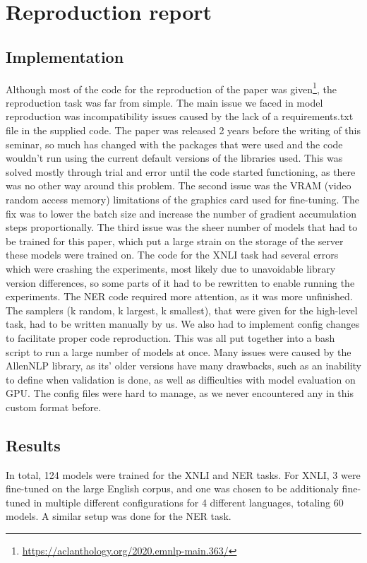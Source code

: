 \documentclass[times, utf8, seminar, english]{fer}
\begin{document}
\chapter[Reproduction report]{Reproduction report}
\section{Implementation}
Although most of the code for the reproduction of the paper was given\footnote{\url{https://aclanthology.org/2020.emnlp-main.363/}}, the reproduction task was far from simple. The main issue we faced in model reproduction was incompatibility issues caused by the lack of a requirements.txt file in the supplied code.  The paper was released 2 years before the writing of this seminar, so much has changed with the packages that were used and the code wouldn't run using the current default versions of the libraries used. This was solved mostly through trial and error until the code started functioning, as there was no other way around this problem. The second issue was the VRAM (video random access memory) limitations of the graphics card used for fine-tuning. The fix was to lower the batch size and increase the number of gradient accumulation steps proportionally. The third issue was the sheer number of models that had to be trained for this paper, which put a large strain on the storage of the server these models were trained on. The code for the XNLI task had several errors which were crashing the experiments, most likely due to unavoidable library version differences, so some parts of it had to be rewritten to enable running the experiments. The NER code required more attention, as it was more unfinished. The samplers (k random, k largest, k smallest), that were given for the high-level task, had to be written manually by us. We also had to implement config changes to facilitate proper code reproduction. This was all put together into a bash script to run a large number of models at once. Many issues were caused by the AllenNLP library, as its' older versions have many drawbacks, such as an inability to define when validation is done, as well as difficulties with model evaluation on GPU. The config files were hard to manage, as we never encountered any in this custom format before.

\section{Results}
\label{section:results}

In total, 124 models were trained for the XNLI and NER tasks. For XNLI, 3 were fine-tuned on the large English corpus, and one was chosen to be additionaly fine-tuned in multiple different configurations for 4 different languages, totaling 60 models. A similar setup was done for the NER task.
\end{document}
